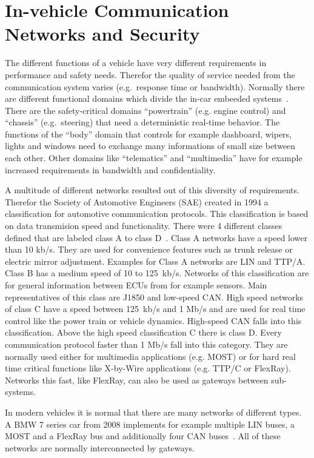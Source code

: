 

\section{In-vehicle Communication Networks and Security}\label{sec:communication-networks}

The different functions of a vehicle have very different requirements in
performance and safety needs. Therefor the quality of service needed from the
communication system varies (e.g.\ response time or bandwidth). Normally there
are different functional domains which divide the in-car embeeded systems~\cite{Navet2017}. There are the safety-critical domains ``powertrain'' (e.g.
engine control) and ``chassis'' (e.g.\ steering) that need a deterministic
real-time behavior. The functions of the ``body'' domain that controls for example
dashboard, wipers, lights and windows need to exchange many informations of
small size between each other. Other domains like ``telematics'' and ``multimedia''
have for example increased requirements in bandwidth and confidentiality.

A multitude of different networks resulted out of this diversity of
requirements. Therefor the Society of Automotive Engineers (SAE) created in 1994
a classification for automotive communication protocols. This classification is
based on data transmision speed and functionality. There were 4 different
classes defined that are labeled class A to class D~\cite{Ali2017}. Class A
networks have a speed lower than 10 kb/s. They are used for convenience features
such as trunk release or electric mirror adjustment. Examples for Class A
networks are LIN and TTP/A. Class B has a medium speed of 10 to 125~kb/s.
Networks of this classification are for general information between ECUs from
for example sensors. Main representatives of this class are J1850 and low-speed
CAN. High speed networks of class C have a speed between 125~kb/s and 1 Mb/s and
are used for real time control like the power train or vehicle dynamics.
High-speed CAN falls into this classification. Above the high speed
classification C there is class D. Every communication protocol faster than 1
Mb/s fall into this category. They are normally used either for multimedia
applications (e.g. MOST) or for hard real time critical functions like X-by-Wire
applications (e.g. TTP/C or FlexRay). Networks this fast, like FlexRay, can also
be used as gateways between sub-systems.

In modern vehicles it is normal that there are many networks of different types.
A BMW 7 series car from 2008 implements for example multiple LIN buses, a MOST
and a FlexRay bus and additionally four CAN buses~\cite{Kellermann2008}. All of
these networks are normally interconnected by gateways.

